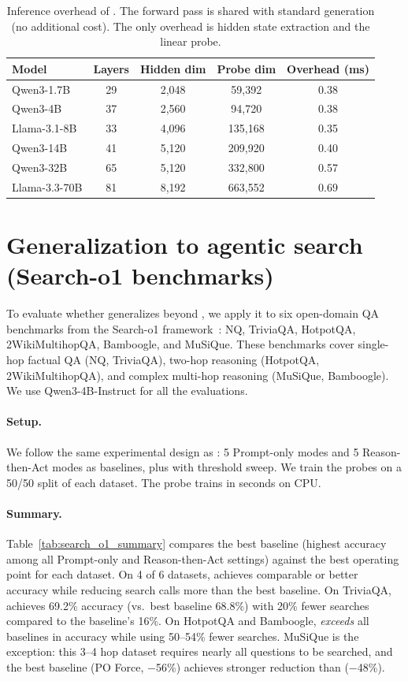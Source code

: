 \begin{table}[H]
\caption{Inference overhead of \method{}. The forward pass is shared with standard generation (no additional cost). The only overhead is hidden state extraction and the linear probe.}
\label{tab:overhead}
\centering
\small
\begin{tabular}{lcccc}
\toprule
Model & Layers & Hidden dim & Probe dim & Overhead (ms) \\
\midrule
Qwen3-1.7B      & 29 & 2,048 & 59,392  & 0.38 \\
Qwen3-4B        & 37 & 2,560 & 94,720  & 0.38 \\
Llama-3.1-8B    & 33 & 4,096 & 135,168 & 0.35 \\
Qwen3-14B       & 41 & 5,120 & 209,920 & 0.40 \\
Qwen3-32B       & 65 & 5,120 & 332,800 & 0.57 \\
Llama-3.3-70B   & 81 & 8,192 & 663,552 & 0.69 \\
\bottomrule
\end{tabular}
\end{table}

\newpage
\section{Generalization to agentic search (Search-o1 benchmarks)}
\label{app:search_o1}

To evaluate whether \method{} generalizes beyond \benchmark{}, we apply it to six open-domain QA benchmarks from the Search-o1 framework~\citep{li2025search}: NQ, TriviaQA, HotpotQA, 2WikiMultihopQA, Bamboogle, and MuSiQue. These benchmarks cover single-hop factual QA (NQ, TriviaQA), two-hop reasoning (HotpotQA, 2WikiMultihopQA), and complex multi-hop reasoning (MuSiQue, Bamboogle). We use Qwen3-4B-Instruct for all the evaluations.

\paragraph{Setup.}
We follow the same experimental design as \benchmark{}: 5 Prompt-only modes and 5 Reason-then-Act modes as baselines, plus \method{} with threshold sweep. We train the probes on a 50/50 split of each dataset. The probe trains in seconds on CPU.

\paragraph{Summary.}
Table~\ref{tab:search_o1_summary} compares the best baseline (highest accuracy among all Prompt-only and Reason-then-Act settings) against the best \method{} operating point for each dataset. On 4 of 6 datasets, \method{} achieves comparable or better accuracy while reducing search calls more than the best baseline. On TriviaQA, \method{} achieves 69.2\% accuracy (vs.\ best baseline 68.8\%) with 20\% fewer searches compared to the baseline's 16\%. On HotpotQA and Bamboogle, \method{} \emph{exceeds} all baselines in accuracy while using 50--54\% fewer searches. MuSiQue is the exception: this 3--4 hop dataset requires nearly all questions to be searched, and the best baseline (PO Force, $-$56\%) achieves stronger reduction than \method{} ($-$48\%).

